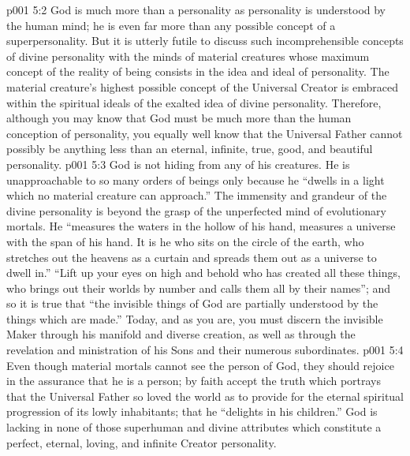 \vs p001 5:2 God is much more than a personality as personality is understood by the human mind; he is even far more than any possible concept of a superpersonality. But it is utterly futile to discuss such incomprehensible concepts of divine personality with the minds of material creatures whose maximum concept of the reality of being consists in the idea and ideal of personality. The material creature’s highest possible concept of the Universal Creator is embraced within the spiritual ideals of the exalted idea of divine personality. Therefore, although you may know that God must be much more than the human conception of personality, you equally well know that the Universal Father cannot possibly be anything less than an eternal, infinite, true, good, and beautiful personality.
\vs p001 5:3 God is not hiding from any of his creatures. He is unapproachable to so many orders of beings only because he “dwells in a light which no material creature can approach.” The immensity and grandeur of the divine personality is beyond the grasp of the unperfected mind of evolutionary mortals. He “measures the waters in the hollow of his hand, measures a universe with the span of his hand. It is he who sits on the circle of the earth, who stretches out the heavens as a curtain and spreads them out as a universe to dwell in.” “Lift up your eyes on high and behold who has created all these things, who brings out their worlds by number and calls them all by their names”; and so it is true that “the invisible things of God are partially understood by the things which are made.” Today, and as you are, you must discern the invisible Maker through his manifold and diverse creation, as well as through the revelation and ministration of his Sons and their numerous subordinates.
\vs p001 5:4 Even though material mortals cannot see the person of God, they should rejoice in the assurance that he is a person; by faith accept the truth which portrays that the Universal Father so loved the world as to provide for the eternal spiritual progression of its lowly inhabitants; that he “delights in his children.” God is lacking in none of those superhuman and divine attributes which constitute a perfect, eternal, loving, and infinite Creator personality.
